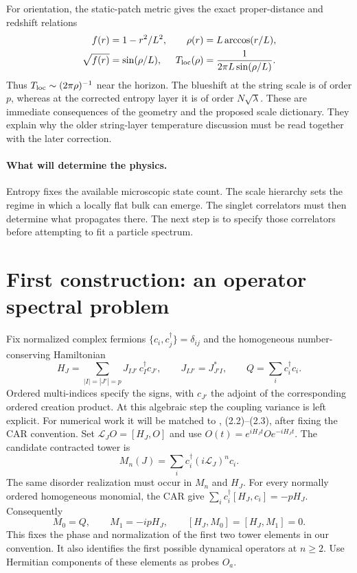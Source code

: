 \documentclass[11pt,a4paper]{article}
\begin{document}
For orientation, the static-patch metric gives the exact proper-distance
and redshift relations
\begin{align}
 f(r)&=1-r^2/L^2, & \rho(r)&=L\arccos(r/L),\nonumber\\
 \sqrt{f(r)}&=\sin(\rho/L), &
 T_{\rm loc}(\rho)&=\frac{1}{2\pi L\sin(\rho/L)}.
\end{align}
Thus $T_{\rm loc}\sim(2\pi\rho)^{-1}$ near the horizon. The blueshift
at the string scale is of order $p$, whereas at the corrected entropy
layer it is of order $N\sqrt\lambda$. These are immediate consequences
of the geometry and the proposed scale dictionary. They explain why
the older string-layer temperature discussion must be read together
with the later correction.

\paragraph{What will determine the physics.}
Entropy fixes the available microscopic state count. The scale hierarchy
sets the regime in which a locally flat bulk can emerge. The singlet
correlators must then determine what propagates there. The next step is
to specify those correlators before attempting to fit a particle spectrum.

\newpage
\section{First construction: an operator spectral problem}
Fix normalized complex fermions $\{c_i,c_j^\dagger\}=\delta_{ij}$ and
the homogeneous number-conserving Hamiltonian
\begin{equation}
 H_J=\sum_{|I|=|J'|=p}J_{I J'}\,c_I^\dagger c_{J'},
 \qquad J_{I J'}=J_{J'I}^*,\qquad Q=\sum_i c_i^\dagger c_i.
\end{equation}
Ordered multi-indices specify the signs, with $c_{J'}$ the adjoint of
the corresponding ordered creation product. At this algebraic step
the coupling variance is left explicit. For numerical work it will be
matched to \cite{mss25}, (2.2)--(2.3), after fixing the CAR convention.
Set $\mathcal L_J O=[H_J,O]$ and use $O(t)=e^{iH_Jt}Oe^{-iH_Jt}$.
The candidate contracted tower is
\begin{equation}
 M_n(J)=\sum_i c_i^\dagger(i\mathcal L_J)^n c_i .
\end{equation}
The same disorder realization must occur in $M_n$ and $H_J$.
For every normally ordered homogeneous monomial, the CAR give
$\sum_i c_i^\dagger[H_J,c_i]=-pH_J$. Consequently
\begin{equation}
 M_0=Q,\qquad M_1=-ipH_J,\qquad [H_J,M_0]=[H_J,M_1]=0.\label{ward}
\end{equation}
This fixes the phase and normalization of the first two tower elements
in our convention. It also identifies the first possible dynamical
operators at $n\ge2$. Use Hermitian components of these elements as
probes $O_a$.
\end{document}
